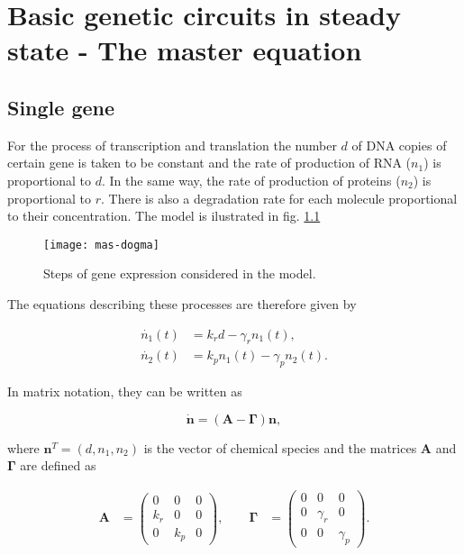 \chapter{Basic genetic circuits in steady state - The master equation}

\section{Single gene}

For the process of transcription and translation the number $d$ of DNA copies of certain gene is taken to be constant and the rate of production of RNA ($n_1$) is proportional to $d$. In the same way, the rate of production of proteins ($n_2$) is proportional to $r$. There is also a degradation rate for each molecule proportional to their concentration. The model is ilustrated in fig. \ref{fig:mas-dogma}

\begin{figure}[H]
  \centering
  \texttt{[image: mas-dogma]}
  \caption[Model of gene expression for a single gene]{\label{fig:mas-dogma} Steps of gene expression considered in the model.}
\end{figure}

The equations describing these processes are therefore given by

\begin{align}
  \dot{n_1}(t) &= k_rd-\gamma_rn_1(t), \label{eq:1}\\
  \dot{n_2}(t) &= k_pn_1(t)-\gamma_pn_2(t). \label{eq:2}
\end{align}

In matrix notation, they can be written as

\begin{equation}
  \label{eq:matdet}
  \mathbf{\dot{n}} = \left( \mathbf{A} - \mathbf{\Gamma} \right) \mathbf{n},
\end{equation}

where $\mathbf{n}^T=(d,n_1,n_2)$ is the vector of chemical species and the matrices $\mathbf{A}$ and $\mathbf{\Gamma}$ are defined as

\begin{eqnarray}
  \mathbf{A} &=
  \begin{pmatrix}
    0 & 0 & 0 \\
    k_r & 0 & 0 \\
    0 & k_p & 0
  \end{pmatrix},\quad \quad
  \mathbf{\Gamma} &=
  \begin{pmatrix}
    0 & 0 & 0 \\
    0 & \gamma_r & 0 \\
    0 & 0 & \gamma_p
  \end{pmatrix}.
\end{eqnarray}

